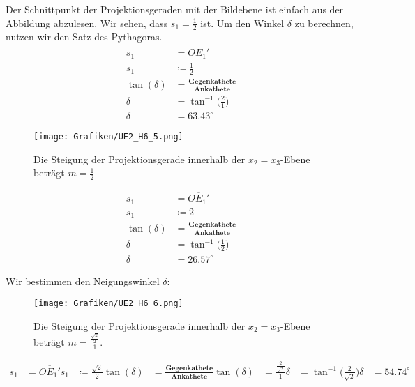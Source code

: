 \begin{Loesung}
\begin{Teilloesungen}
Der Schnittpunkt der Projektionsgeraden mit der Bildebene ist einfach aus der Abbildung abzulesen. Wir sehen, dass \ensuremath{s_1 = \frac{1}{2}} ist. Um den Winkel \ensuremath{\delta} zu berechnen, nutzen wir den Satz des Pythagoras.
\begin{align*}
s_1 &= \overline{OE_1'}\\
s_1 &\coloneqq \frac{1}{2}\\
\tan(\delta) &=\frac{\textbf{Gegenkathete}}{\textbf{Ankathete}}\\
\delta &= \tan^{-1}\Big(\frac{2}{1}\Big)\\
\delta &= 63.43^\circ
\end{align*}

\item \begin{figure}[H]
	\centering
	\texttt{[image: Grafiken/UE2\_H6\_5.png]}
	\caption{Die Steigung der Projektionsgerade innerhalb der \ensuremath{x_2 = x_3}-Ebene beträgt \ensuremath{m = \frac{1}{2}}}
	\label{fig.H6_4}
\end{figure} 

\begin{align*}
s_1 &= \overline{OE_1'}\\
s_1 &\coloneqq 2\\
\tan(\delta) &=\frac{\textbf{Gegenkathete}}{\textbf{Ankathete}}\\
\delta &= \tan^{-1}\Big(\frac{1}{2}\Big)\\
\delta &= 26.57^\circ
\end{align*}

\item Wir bestimmen den Neigungswinkel $\delta$:
\begin{figure}[H]
	\centering
	\texttt{[image: Grafiken/UE2\_H6\_6.png]}
	\label{fig.H6_5}
	\caption{Die Steigung der Projektionsgerade innerhalb der \ensuremath{x_2 = x_3}-Ebene beträgt 
	\ensuremath{m = \frac{\frac{\sqrt{2}}{2}}{1}}.}
\end{figure} 
\begin{align*}
s_1 &= \overline{OE_1'}
s_1 &\coloneqq \frac{\sqrt{2}}{2}
\tan(\delta) &= \frac{\textbf{Gegenkathete}}{\textbf{Ankathete}}
\tan(\delta) &= \frac{\frac{2}{\sqrt{2}}}{1}
\delta &= \tan^{-1}\Big(\frac{2}{\sqrt{2}}\Big)
\delta &= 54.74 ^\circ
\end{align*}
\end{Teilloesungen}
\end{Loesung}